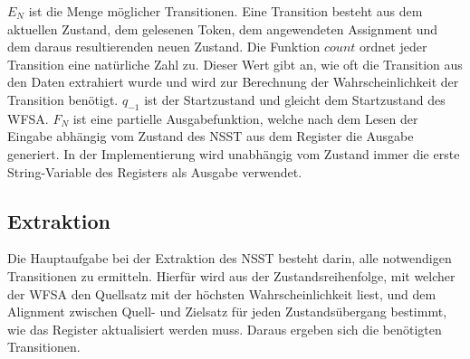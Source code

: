 \documentclass[conference]{IEEEtran}
\begin{document}
$E_N$ ist die Menge möglicher Transitionen.
Eine Transition besteht aus dem aktuellen Zustand, dem gelesenen Token, dem angewendeten Assignment und dem daraus resultierenden neuen Zustand.
Die Funktion $count$ ordnet jeder Transition eine natürliche Zahl zu.
Dieser Wert gibt an, wie oft die Transition aus den Daten extrahiert wurde und wird zur Berechnung der Wahrscheinlichkeit der Transition benötigt.
$q_{-1}$ ist der Startzustand und gleicht dem Startzustand des WFSA.
$F_N$ ist eine partielle Ausgabefunktion, welche nach dem Lesen der Eingabe abhängig vom Zustand des NSST aus dem Register die Ausgabe generiert.
In der Implementierung wird unabhängig vom Zustand immer die erste String-Variable des Registers als Ausgabe verwendet.


\subsection{Extraktion}
Die Hauptaufgabe bei der Extraktion des NSST besteht darin, alle notwendigen Transitionen zu ermitteln.
Hierfür wird aus der Zustandsreihenfolge, mit welcher der WFSA den Quellsatz mit der höchsten Wahrscheinlichkeit liest, 
und dem Alignment zwischen Quell- und Zielsatz für jeden Zustandsübergang bestimmt, wie das Register aktualisiert werden muss.
Daraus ergeben sich die benötigten Transitionen.
\end{document}
